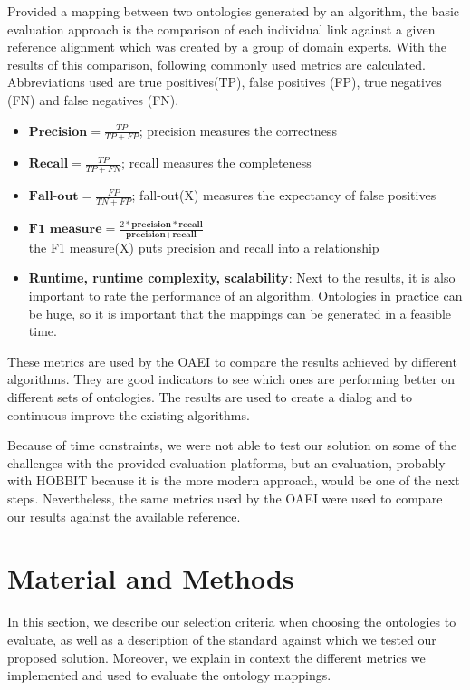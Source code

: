 \documentclass[runningheads]{llncs}
\begin{document}
Provided a mapping between two ontologies generated by an algorithm, the basic evaluation approach is the comparison of each individual link against a given reference alignment which was created by a group of domain experts. With the results of this comparison, following commonly used metrics \cite{Euzenat2} are calculated. Abbreviations used are true positives(TP), false positives (FP), true negatives (FN) and false negatives (FN).

\begin{itemize}
    \item $\textbf{Precision} = \frac{TP}{TP+FP}$; precision measures the correctness
    \item $\textbf{Recall} = \frac{TP}{TP+FN}$; recall measures the completeness
    \item $\textbf{Fall-out} = \frac{FP}{TN+FP}$; fall-out(X) measures the expectancy of false positives
    \item $\textbf{F1 measure} = \frac{2* \textbf{precision} * \textbf{recall}}{\textbf{precision} + \textbf{recall}}$\\ the F1 measure(X) puts precision and recall into a relationship
    \item \textbf{Runtime, runtime complexity, scalability}: Next to the results, it is also important to rate the performance of an algorithm. Ontologies in practice can be huge, so it is important that the mappings can be generated in a feasible time.
\end{itemize}

These metrics are used by the OAEI to compare the results achieved by different algorithms. They are good indicators to see which ones are performing better on different sets of ontologies. The results are used to create a dialog and to continuous improve the existing algorithms.

Because of time constraints, we were not able to test our solution on some of the challenges with the provided evaluation platforms, but an evaluation, probably with HOBBIT because it is the more modern approach, would be one of the next steps. Nevertheless, the same metrics used by the OAEI were used to compare our results against the available reference.

\section{Material and Methods} \label{material_methods}
In this section, we describe our selection criteria when choosing the ontologies to evaluate, as well as a description of the standard against which we tested our proposed solution.
Moreover, we explain in context the different metrics we implemented and used to evaluate the ontology mappings.
\end{document}
